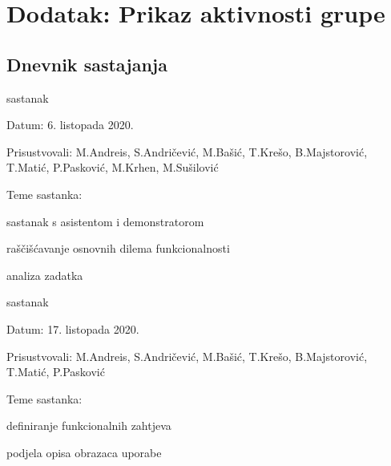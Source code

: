 \chapter*{Dodatak: Prikaz aktivnosti grupe}
		
		\section*{Dnevnik sastajanja}
		
		\begin{packed_enum}
			\item  sastanak
			
			\item[] \begin{packed_item}
				\item Datum: 6. listopada 2020.
				\item Prisustvovali: M.Andreis, S.Andričević, M.Bašić, T.Krešo, B.Majstorović, T.Matić, P.Pasković, M.Krhen, M.Sušilović 
				\item Teme sastanka:
				\begin{packed_item}
					\item  sastanak s asistentom i demonstratorom
					\item  raščišćavanje osnovnih dilema funkcionalnosti
					\item analiza zadatka
				\end{packed_item}
			\end{packed_item}
			
			\item  sastanak
			\item[] \begin{packed_item}
				\item Datum: 17. listopada 2020.
				\item Prisustvovali: M.Andreis, S.Andričević, M.Bašić, T.Krešo, B.Majstorović, T.Matić, P.Pasković
				\item Teme sastanka:
				\begin{packed_item}
					\item  definiranje funkcionalnih zahtjeva
					\item  podjela opisa obrazaca uporabe
				\end{packed_item}
			\end{packed_item}
		

\end{packed_enum}
